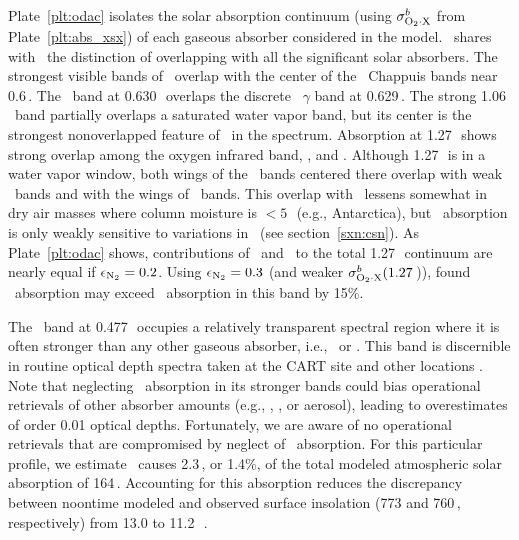 \documentclass[agupp,twoside]{aguplus} %
\begin{document}
Plate~\ref{plt:odac} isolates the solar absorption continuum 
(using $\sigma^{b}_{\mathrm{O}_{2} \cdot \mathrm{X}}$ from Plate~\ref{plt:abs_xsx}) of each gaseous
absorber considered in the model.
\OdX\ shares with \HdO\ the distinction of overlapping with all the
significant solar absorbers.   
The strongest visible bands of \OdOd\ overlap with the center of the
\Ot\ Chappuis bands near 0.6\,\um.
The \OdOd\ band at $0.630$\,\um\ overlaps the discrete \Od\ $\gamma$
band at 0.629\,\um.
The strong 1.06\,\um\ band partially overlaps a saturated water vapor
band, but its center is the strongest nonoverlapped feature of \OdOd\
in the spectrum.
Absorption at 1.27\,\um\ shows strong overlap among the oxygen infrared 
band, \OdOd, and \OdNd.
Although 1.27\,\um\ is in a water vapor window, both wings of the \OdX\
bands centered there overlap with weak \COd\ bands and with the
wings of \HdO\ bands. 
This overlap with \HdO\ lessens somewhat in dry air masses where
column moisture is $< 5$\,\kgxmS\ (e.g., Antarctica), but \OdX\ 
absorption is only weakly sensitive to variations in \HdO\ (see
section~\ref{sxn:csn}). 
As Plate~\ref{plt:odac} shows, contributions of \OdNd\ and \OdOd\ to
the total 1.27\,\um\ continuum are nearly equal if $\epsilon_{\mathrm{N}_{2}} = 0.2$.
Using $\epsilon_{\mathrm{N}_{2}} = 0.3$ (and weaker $\sigma^{b}_{\mathrm{O}_{2} \cdot \mathrm{X}}(1.27$\,\um)), \cite{MCB98}  
found \OdNd\ absorption may exceed \OdOd\ absorption in this band by
15\%.  

The \OdOd\ band at 0.477\,\um\ occupies a relatively transparent
spectral region where it is often stronger than any other gaseous
absorber, i.e., \Ot\ or \NOd.
This band is discernible in routine optical depth spectra taken at the 
CART site and other locations \cite[]{MBB99}.
Note that neglecting \OdOd\ absorption in its stronger bands
could bias operational retrievals of other absorber amounts (e.g.,
\Ot, \NOd, or aerosol), leading to overestimates of order 0.01 optical 
depths.  
Fortunately, we are aware of no operational retrievals that are 
compromised by neglect of \OdOd\ absorption.
For this particular profile, we estimate \OdX\ causes 2.3\,\wxmS, or
1.4\%, of the total modeled atmospheric solar absorption of 164\,\wxmS.
Accounting for this absorption reduces the discrepancy between
noontime modeled and observed surface insolation (773 and 760\,\wxmS,
respectively) from 13.0 to 11.2\,\wxmS\ \cite[]{ZBP97}.   
\end{document}
